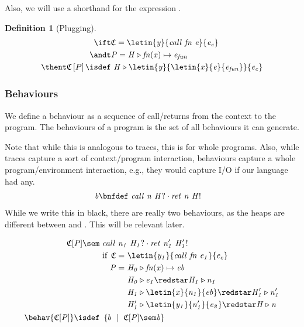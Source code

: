 \documentclass{article}
\newtheorem{definition}[theorem]{Definition}
\theoremstyle{definition}
\begin{document}
Also, we will use a shorthand  for the expression .


\begin{definition}[Plugging]
\begin{align*}
		\ift
		&
		\com{\ctx = \letin{y}{call~fn~e}{e_c} }
		\\
		\andt 
		&
		\com{P = H\triangleright fn(x)\mapsto e_{{fun}}}
		\\
		\thent 
		\ctx\hole{P} \isdef&\ 
			\com{
				H\triangleright
				\letin{y}{\letin{x}{e}{e_{fun}}}{e_c}
			}
\end{align*}
\end{definition}

\subsubsection{Behaviours}
We define a behaviour as a sequence of call/returns from the context to the program.
The behaviours of a program is the set of all behaviours it can generate.

Note that while this is analogous to traces, this is for whole programs.
Also, while traces capture a sort of context/program interaction, behaviours capture a whole program/environment interaction, e.g., they would capture I/O if our language had any.
\begin{align*}
	\com{b} \bnfdef
		&\
		\com{call~n~H?} \cdot \com{ret~n~H!}
\end{align*}
While we write this in black, there are really two behaviours, as the heaps are different between \Sh and \Th.
This will be relevant later.

\begin{align*}
	\com{\ctxhc{P}} \sem&\ \com{\com{call~n_1~H_1?} \cdot \com{ret~n_1'~H_1'!}}
	\\
		&\text{ if }
		\begin{aligned}[t]
			\com{\ctx} =&\ \com{\letin{y_1}{call~fn~e_1}{e_c}}
			\\
			\com{P} =&\ \com{H_0\triangleright fn(x)\mapsto eb}
			\\
			&\
			\com{H_0\triangleright e_1 \redstar H_1\triangleright n_1}
			\\
			&\
			\com{H_1\triangleright \letin{x}{n_1}{eb} \redstar H_1'\triangleright n_1'}
			\\
			&\
			\com{H_1'\triangleright \letin{y_1}{n_1'}{e_2} \redstar H\triangleright n}
		\end{aligned}
	\\
	\behav{\ctxhc{P}} \isdef
		&\
		\myset{ b }{ \com{\ctxhc{P}\sem b} }
\end{align*}
\end{document}
